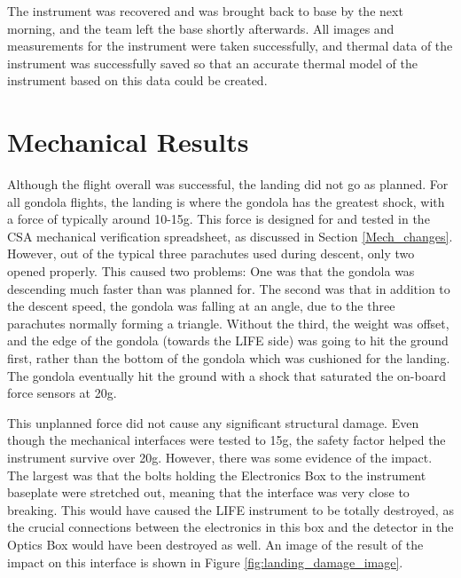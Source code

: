 The instrument was recovered and was brought back to base by the next morning, and the team left the base shortly afterwards. All images and measurements for the instrument were taken successfully, and thermal data of the instrument was successfully saved so that an accurate thermal model of the instrument based on this data could be created.

\section{Mechanical Results}
Although the flight overall was successful, the landing did not go as planned. For all gondola flights, the landing is where the gondola has the greatest shock, with a force of typically around 10-15g. This force is designed for and tested in the CSA mechanical verification spreadsheet, as discussed in Section \ref{Mech_changes}. However, out of the typical three parachutes used during descent, only two opened properly. This caused two problems: One was that the gondola was descending much faster than was planned for. The second was that in addition to the descent speed, the gondola was falling at an angle, due to the three parachutes normally forming a triangle. Without the third, the weight was offset, and the edge of the gondola (towards the LIFE side) was going to hit the ground first, rather than the bottom of the gondola which was cushioned for the landing. The gondola eventually hit the ground with a shock that saturated the on-board force sensors at 20g.

This unplanned force did not cause any significant structural damage. Even though the mechanical interfaces were tested to 15g, the safety factor helped the instrument survive over 20g. However, there was some evidence of the impact. The largest was that the bolts holding the Electronics Box to the instrument baseplate were stretched out, meaning that the interface was very close to breaking. This would have caused the LIFE instrument to be totally destroyed, as the crucial connections between the electronics in this box and the detector in the Optics Box would have been destroyed as well. An image of the result of the impact on this interface is shown in Figure \ref{fig:landing_damage_image}.

